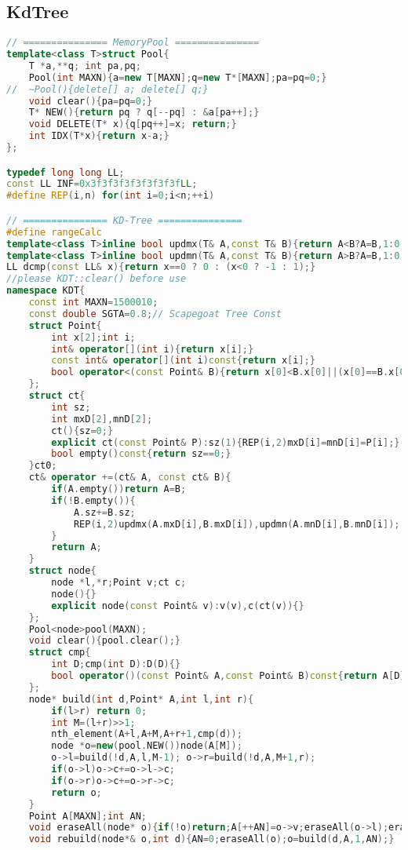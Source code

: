 \subsection{KdTree}
\begin{lstlisting}[language=C++]
// =============== MemoryPool ===============
template<class T>struct Pool{
    T *a,**q; int pa,pq;
    Pool(int MAXN){a=new T[MAXN];q=new T*[MAXN];pa=pq=0;}
//  ~Pool(){delete[] a; delete[] q;}
    void clear(){pa=pq=0;}
    T* NEW(){return pq ? q[--pq] : &a[pa++];}
    void DELETE(T* x){q[pq++]=x; return;}
    int IDX(T*x){return x-a;}
};

typedef long long LL;
const LL INF=0x3f3f3f3f3f3f3f3fLL;
#define REP(i,n) for(int i=0;i<n;++i)

// =============== KD-Tree ===============
#define rangeCalc
template<class T>inline bool updmx(T& A,const T& B){return A<B?A=B,1:0;}
template<class T>inline bool updmn(T& A,const T& B){return A>B?A=B,1:0;}
LL dcmp(const LL& x){return x==0 ? 0 : (x<0 ? -1 : 1);}
//please KDT::clear() before use
namespace KDT{
    const int MAXN=1500010;
    const double SGTA=0.8;// Scapegoat Tree Const
    struct Point{
        int x[2];int i;
        int& operator[](int i){return x[i];}
        const int& operator[](int i)const{return x[i];}
        bool operator<(const Point& B){return x[0]<B.x[0]||(x[0]==B.x[0]&&x[1]<B.x[1]);}
    };
    struct ct{
        int sz;
        int mxD[2],mnD[2];
        ct(){sz=0;}
        explicit ct(const Point& P):sz(1){REP(i,2)mxD[i]=mnD[i]=P[i];}
        bool empty()const{return sz==0;}
    }ct0;
    ct& operator +=(ct& A, const ct& B){
        if(A.empty())return A=B;
        if(!B.empty()){
            A.sz+=B.sz;
            REP(i,2)updmx(A.mxD[i],B.mxD[i]),updmn(A.mnD[i],B.mnD[i]);
        }
        return A;
    }
    struct node{
        node *l,*r;Point v;ct c;
        node(){}
        explicit node(const Point& v):v(v),c(ct(v)){}
    };
    Pool<node>pool(MAXN);
    void clear(){pool.clear();}
    struct cmp{
        int D;cmp(int D):D(D){}
        bool operator()(const Point& A,const Point& B)const{return A[D]<B[D];}
    };
    node* build(int d,Point* A,int l,int r){
        if(l>r) return 0;
        int M=(l+r)>>1;
        nth_element(A+l,A+M,A+r+1,cmp(d));
        node *o=new(pool.NEW())node(A[M]);
        o->l=build(!d,A,l,M-1); o->r=build(!d,A,M+1,r);
        if(o->l)o->c+=o->l->c;
        if(o->r)o->c+=o->r->c;
        return o;
    }
    Point A[MAXN];int AN;
    void eraseAll(node* o){if(!o)return;A[++AN]=o->v;eraseAll(o->l);eraseAll(o->r);pool.DELETE(o);}
    void rebuild(node*& o,int d){AN=0;eraseAll(o);o=build(d,A,1,AN);}

\end{lstlisting}
